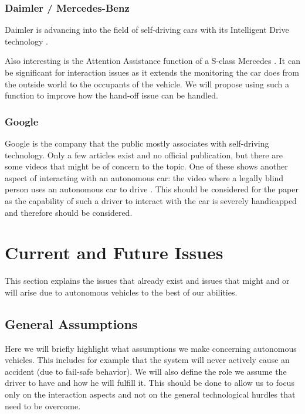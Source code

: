 \documentclass{acm_proc_article-sp}
\begin{document}
\subsubsection{Daimler / Mercedes-Benz}

Daimler is advancing into the field of self-driving cars with its Intelligent Drive technology \cite{www:daimler_intelligent_drive}.

Also interesting is the Attention Assistance function of a S-class Mercedes \cite{www:mercedes_attention_assist}.
It can be significant for interaction issues as it extends the monitoring the car does from the outside world to the occupants of the vehicle.
We will propose using such a function to improve how the hand-off issue can be handled.

\subsubsection{Google}

Google is the company that the public mostly associates with self-driving technology.
Only a few articles exist and no official publication, but there are some videos that might be of concern to the topic.
One of these shows another aspect of interacting with an autonomous car: the video where a legally blind person uses an autonomous car to drive \cite{www:google_blind}.
This should be considered for the paper as the capability of such a driver to interact with the car is severely handicapped and therefore should be considered.

\section{Current and Future Issues}

This section explains the issues that already exist and issues that might and or will arise due to autonomous vehicles to the best of our abilities.

\subsection{General Assumptions}

Here we will briefly highlight what assumptions we make concerning autonomous vehicles.
This includes for example that the system will never actively cause an accident (due to fail-safe behavior).
We will also define the role we assume the driver to have and how he will fulfill it.
This should be done to allow us to focus only on the interaction aspects and not on the general technological hurdles that need to be overcome.
\end{document}
